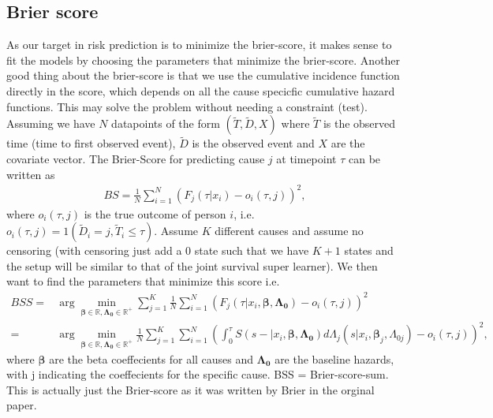 \documentclass[11pt]{article}
\begin{document}
\subsection{Brier score}
\label{sec:org42e6b37}
As our target in risk prediction is to minimize the brier-score, it makes sense to fit the models by choosing the parameters that minimize the brier-score. Another good thing about the brier-score is that we use the cumulative incidence function directly in the score, which depends on all the cause specicfic cumulative hazard functions. This may solve the problem without needing a constraint (test).
\\[0pt]
Assuming we have \(N\) datapoints of the form \((\tilde{T},\tilde{D},X)\) where \(\tilde{T}\) is the observed time (time to first observed event), \(\tilde{D}\) is the observed event and \(X\) are the covariate vector. The Brier-Score for predicting cause \(j\) at timepoint \(\tau\) can be written as
\begin{align*}
BS = \frac{1}{N}\sum_{i = 1}^N(F_j(\tau|x_i)-o_i(\tau,j))^2,
\end{align*}
where \(o_i(\tau,j)\) is the true outcome of person \(i\), i.e. \(o_i(\tau,j) = 1(\tilde{D}_i= j,\tilde{T}_i\leq \tau)\). Assume \(K\) different causes and assume no censoring (with censoring just add a 0 state such that we have \(K+1\) states and the setup will be similar to that of the joint survival super learner). We then want to find the parameters that minimize this score i.e.
\begin{align*}
BSS = &\arg\min_{\boldsymbol{\beta}\in\mathbb{R},\boldsymbol{\Lambda_0}\in\mathbb{R}^+}\sum_{j = 1}^K\frac{1}{N}\sum_{i = 1}^N(F_j(\tau|x_i,\boldsymbol{\beta},\boldsymbol{\Lambda_0})-o_i(\tau,j))^2\\
= &\arg\min_{\boldsymbol{\beta}\in\mathbb{R},\boldsymbol{\Lambda_0}\in\mathbb{R}^+}\frac{1}{N}\sum_{j = 1}^K\sum_{i = 1}^N\left(\int_0^{\tau} S(s-|x_i,\boldsymbol{\beta},\boldsymbol{\Lambda_0})d\Lambda_j(s|x_i,\boldsymbol{\beta}_j,\Lambda_{0j})-o_i(\tau,j)\right)^2,
\end{align*}
where \(\boldsymbol{\beta}\) are the beta coeffecients for all causes and \(\boldsymbol{\Lambda_0}\) are the baseline hazards, with j indicating the coeffecients for the specific cause. BSS = Brier-score-sum. This is actually just the Brier-score as it was written by Brier in the orginal paper. 
\end{document}
